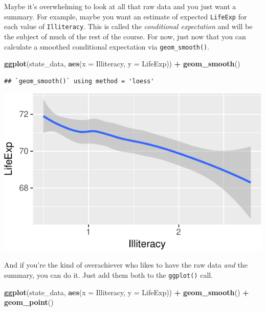 \documentclass[12pt,oneside,openany]{book}
\newenvironment{Shaded}{\begin{snugshade}}{\end{snugshade}}
\newcommand{\KeywordTok}[1]{\textcolor[rgb]{0.13,0.29,0.53}{\textbf{#1}}}
\newcommand{\DataTypeTok}[1]{\textcolor[rgb]{0.13,0.29,0.53}{#1}}
\newcommand{\StringTok}[1]{\textcolor[rgb]{0.31,0.60,0.02}{#1}}
\newcommand{\OperatorTok}[1]{\textcolor[rgb]{0.81,0.36,0.00}{\textbf{#1}}}
\newcommand{\NormalTok}[1]{#1}
\begin{document}
Maybe it's overwhelming to look at all that raw data and you just want a
summary. For example, maybe you want an estimate of expected
\texttt{LifeExp} for each value of \texttt{Illiteracy}. This is called
the \emph{conditional expectation} and will be the subject of much of
the rest of the course. For now, just now that you can calculate a
smoothed conditional expectation via \texttt{geom\_smooth()}.

\begin{Shaded}
\begin{Highlighting}[]
\KeywordTok{ggplot}\NormalTok{(state_data, }\KeywordTok{aes}\NormalTok{(}\DataTypeTok{x =}\NormalTok{ Illiteracy, }\DataTypeTok{y =}\NormalTok{ LifeExp)) }\OperatorTok{+}
\StringTok{  }\KeywordTok{geom_smooth}\NormalTok{()}
\end{Highlighting}
\end{Shaded}

\begin{verbatim}
## `geom_smooth()` using method = 'loess'
\end{verbatim}

\includegraphics{pdaps_files/figure-latex/smooth-1.pdf}

And if you're the kind of overachiever who likes to have the raw data
\emph{and} the summary, you can do it. Just add them both to the
\texttt{ggplot()} call.

\begin{Shaded}
\begin{Highlighting}[]
\KeywordTok{ggplot}\NormalTok{(state_data, }\KeywordTok{aes}\NormalTok{(}\DataTypeTok{x =}\NormalTok{ Illiteracy, }\DataTypeTok{y =}\NormalTok{ LifeExp)) }\OperatorTok{+}
\StringTok{  }\KeywordTok{geom_smooth}\NormalTok{() }\OperatorTok{+}
\StringTok{  }\KeywordTok{geom_point}\NormalTok{()}
\end{Highlighting}
\end{Shaded}
\end{document}
